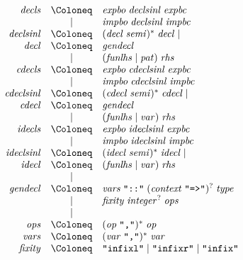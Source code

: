 \begin{align*}
  \begin{array}{rcl}
    \mathit{decls}
    & \Coloneq & \mathit{expbo}\; \mathit{declsinl}\; \mathit{expbc} \\
    & \mid & \mathit{impbo}\; \mathit{declsinl}\; \mathit{impbc} \\
    \mathit{declsinl}
    & \Coloneq & (\mathit{decl}\; \mathit{semi})^*\; \mathit{decl} \mid \\
    \mathit{decl}
    & \Coloneq & \mathit{gendecl} \\
    & \mid & (\mathit{funlhs} \mid \mathit{pat})\; \mathit{rhs} \\
    \mathit{cdecls}
    & \Coloneq & \mathit{expbo}\; \mathit{cdeclsinl}\; \mathit{expbc} \\
    & \mid & \mathit{impbo}\; \mathit{cdeclsinl}\; \mathit{impbc} \\
    \mathit{cdeclsinl}
    & \Coloneq & (\mathit{cdecl}\; \mathit{semi})^*\; \mathit{cdecl} \mid \\
    \mathit{cdecl}
    & \Coloneq & \mathit{gendecl} \\
    & \mid & (\mathit{funlhs} \mid \mathit{var})\; \mathit{rhs} \\
    \mathit{idecls}
    & \Coloneq & \mathit{expbo}\; \mathit{ideclsinl}\; \mathit{expbc} \\
    & \mid & \mathit{impbo}\; \mathit{ideclsinl}\; \mathit{impbc} \\
    \mathit{ideclsinl}
    & \Coloneq & (\mathit{idecl}\; \mathit{semi})^*\; \mathit{idecl} \mid \\
    \mathit{idecl}
    & \Coloneq & (\mathit{funlhs} \mid \mathit{var})\; \mathit{rhs} \\
    & \mid & \\
    \mathit{gendecl}
    & \Coloneq & \mathit{vars}\; \text{\texttt{\textquotedbl ::\textquotedbl}}\; (\mathit{context}\; \text{\texttt{\textquotedbl =>\textquotedbl}})^?\; \mathit{type} \\
    & \mid & \mathit{fixity}\; \mathit{integer}^?\; \mathit{ops} \\
    & \mid & \\
    \mathit{ops}
    & \Coloneq & (\mathit{op}\; \text{\texttt{\textquotedbl,\textquotedbl}})^*\; \mathit{op} \\
    \mathit{vars}
    & \Coloneq & (\mathit{var}\; \text{\texttt{\textquotedbl,\textquotedbl}})^*\; \mathit{var} \\
    \mathit{fixity}
    & \Coloneq & \text{\texttt{\textquotedbl infixl\textquotedbl}}
    \mid \text{\texttt{\textquotedbl infixr\textquotedbl}}
    \mid \text{\texttt{\textquotedbl infix\textquotedbl}}
  \end{array}
\end{align*}

